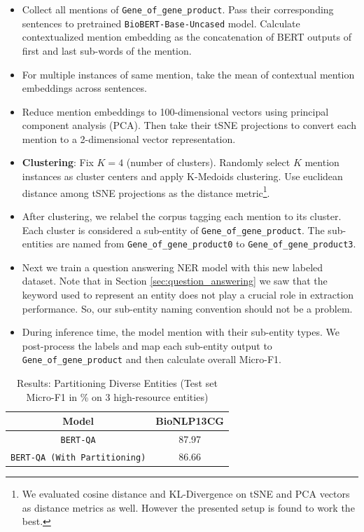 \begin{itemize}
    \item Collect all mentions of \texttt{Gene\_of\_gene\_product}. Pass their corresponding sentences to pretrained \texttt{BioBERT-Base-Uncased} model. Calculate contextualized mention embedding as the concatenation of BERT outputs of first and last sub-words of the mention.
    
    \item For multiple instances of same mention, take the mean of contextual mention embeddings across sentences.
    
    \item Reduce mention embeddings to 100-dimensional vectors using principal component analysis (PCA). Then take their tSNE\cite{van2008visualizing} projections to convert each mention to a 2-dimensional vector representation.
    
    \item \textbf{Clustering}: Fix $K = 4$ (number of clusters). Randomly select $K$ mention instances as cluster centers and apply K-Medoids clustering. Use euclidean distance among tSNE projections as the distance metric\footnote{We evaluated cosine distance and KL-Divergence on tSNE and PCA vectors as distance metrics as well. However the presented setup is found to work the best.}.
    
    \item After clustering, we relabel the corpus tagging each mention to its cluster. Each cluster is considered a sub-entity of \texttt{Gene\_of\_gene\_product}. The sub-entities are named from \texttt{Gene\_of\_gene\_product0} to \texttt{Gene\_of\_gene\_product3}.
    
    \item Next we train a question answering NER model with this new labeled dataset. Note that in Section \ref{sec:question_answering} we saw that the keyword used to represent an entity does not play a crucial role in extraction performance. So, our sub-entity naming convention should not be a problem.
    
    \item During inference time, the model mention with their sub-entity types. We post-process the labels and map each sub-entity output to \texttt{Gene\_of\_gene\_product} and then calculate overall Micro-F1.
\end{itemize}

\begin{table}[h!]
\centering
\begin{tabular}{|c|c|}\hline
	\textbf{Model} & \textbf{BioNLP13CG}\\\hline
	\texttt{BERT-QA} & 87.97\\\hline
	\texttt{BERT-QA (With Partitioning)} & 86.66\\\hline
	\end{tabular}
    \caption{Results: Partitioning Diverse Entities (Test set Micro-F1 in \% on 3 high-resource entities)}
    \label{tab:res_clustering}
\end{table}

